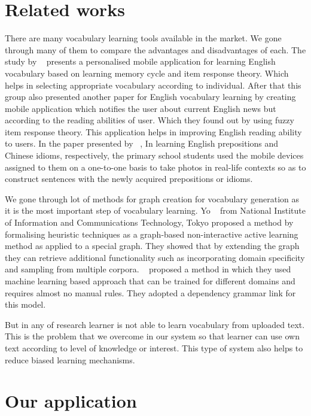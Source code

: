 \documentclass[11pt,a4paper]{article}
\begin{document}
\section{Related works}
There are many vocabulary learning tools available in the market.
We gone through many of them to compare the advantages and disadvantages of each.
The study by ~\citet{chen2008personalized} presents a personalised mobile application for
learning English vocabulary based on learning memory cycle and item response theory.
Which helps in selecting appropriate vocabulary according to individual.
After that this group also presented another paper for English vocabulary
learning by creating mobile application which notifies the user about current
English news but according to the reading abilities of user. Which they found out
by using fuzzy item response theory. This application helps in improving English reading ability to users.
In the paper presented by ~\citet{wong2010mobile}, In learning English prepositions and Chinese idioms, respectively,
the primary school students used the mobile devices assigned to them on a one-to-one basis
to take photos in real-life contexts so as to construct sentences with the newly acquired prepositions or idioms.

We gone through lot of methods for graph creation for vocabulary generation as
it is the most important step of vocabulary learning. Yo ~\citet{ehara2014formalizing}
from National Institute of Information and Communications Technology, Tokyo proposed
a method by formalising heuristic techniques as a graph-based non-interactive active
learning method as applied to a special graph. They showed that by extending the graph
they can retrieve additional functionality such as incorporating domain specificity and sampling from multiple corpora.
~\citet{zhang2001learning} proposed a method in which they used machine learning based approach
that can be trained for different domains and requires almost no manual rules.
They adopted a dependency grammar link for this model.

But in any of research learner is not able to learn vocabulary from uploaded text.
This is the problem that we overcome in our system so that learner can use own text
according to level of knowledge or interest. This type of system also helps to reduce biased learning mechanisms.

\section{Our application}
\end{document}
